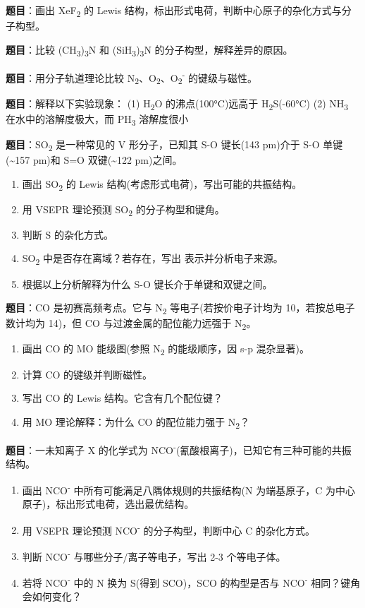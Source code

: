 \documentclass[a4paper,11pt]{ctexart}
\providecommand{\tightlist}{\setlength{\itemsep}{0pt}\setlength{\parskip}{0pt}}
\newcommand{\箭}{\ensuremath{\rightarrow}}
\newcommand{\左箭}{\ensuremath{\leftarrow}}
\newcommand{\上箭}{\ensuremath{\uparrow}}
\newcommand{\下箭}{\ensuremath{\downarrow}}
\newcommand{\衡}{\ensuremath{\rightleftharpoons}}
\newcommand{\双箭}{\ensuremath{\leftrightarrow}}
\newcommand{\约等于}{\ensuremath{\approx}}
\newcommand{\小于等于}{\ensuremath{\leq}}
\newcommand{\大于等于}{\ensuremath{\geq}}
\newcommand{\不等于}{\ensuremath{\neq}}
\newcommand{\西格马}{\ensuremath{\sigma}}
\newcommand{\派}{\ensuremath{\pi}}
\begin{document}
\textbf{题目}：画出 XeF\textsubscript{2} 的 Lewis 结构，标出形式电荷，判断中心原子的杂化方式与分子构型。

\textbf{题目}：比较 (CH\textsubscript{3})\textsubscript{3}N 和 (SiH\textsubscript{3})\textsubscript{3}N 的分子构型，解释差异的原因。

\textbf{题目}：用分子轨道理论比较 N\textsubscript{2}、O\textsubscript{2}、O\textsubscript{2}\textsuperscript{-} 的键级与磁性。

\textbf{题目}：解释以下实验现象：
(1) H\textsubscript{2}O 的沸点(100°C)远高于 H\textsubscript{2}S(-60°C)
(2) NH\textsubscript{3} 在水中的溶解度极大，而 PH\textsubscript{3} 溶解度很小

\textbf{题目}：SO\textsubscript{2} 是一种常见的 V 形分子，已知其 S-O 键长(143 pm)介于 S-O 单键(\textasciitilde157 pm)和 S=O 双键(\textasciitilde122 pm)之间。

\begin{enumerate}
\def\labelenumi{(\arabic{enumi})}
\tightlist
\item
  画出 SO\textsubscript{2} 的 Lewis 结构(考虑形式电荷)，写出可能的共振结构。
\item
  用 VSEPR 理论预测 SO\textsubscript{2} 的分子构型和键角。
\item
  判断 S 的杂化方式。
\item
  SO\textsubscript{2} 中是否存在离域？若存在，写出  表示并分析电子来源。
\item
  根据以上分析解释为什么 S-O 键长介于单键和双键之间。
\end{enumerate}

\textbf{题目}：CO 是初赛高频考点。它与 N\textsubscript{2} 等电子(若按价电子计均为 10，若按总电子数计均为 14)，但 CO 与过渡金属的配位能力远强于 N\textsubscript{2}。

\begin{enumerate}
\def\labelenumi{(\arabic{enumi})}
\tightlist
\item
  画出 CO 的 MO 能级图(参照 N\textsubscript{2} 的能级顺序，因 s-p 混杂显著)。
\item
  计算 CO 的键级并判断磁性。
\item
  写出 CO 的 Lewis 结构。它含有几个配位键？
\item
  用 MO 理论解释：为什么 CO 的配位能力强于 N\textsubscript{2}？
\end{enumerate}

\textbf{题目}：一未知离子 X 的化学式为 NCO\textsuperscript{-}(氰酸根离子)，已知它有三种可能的共振结构。

\begin{enumerate}
\def\labelenumi{(\arabic{enumi})}
\tightlist
\item
  画出 NCO\textsuperscript{-} 中所有可能满足八隅体规则的共振结构(N 为端基原子，C 为中心原子)，标出形式电荷，选出最优结构。
\item
  用 VSEPR 理论预测 NCO\textsuperscript{-} 的分子构型，判断中心 C 的杂化方式。
\item
  判断 NCO\textsuperscript{-} 与哪些分子/离子等电子，写出 2-3 个等电子体。
\item
  若将 NCO\textsuperscript{-} 中的 N 换为 S(得到 SCO)，SCO 的构型是否与 NCO\textsuperscript{-} 相同？键角会如何变化？
\end{enumerate}
\end{document}

